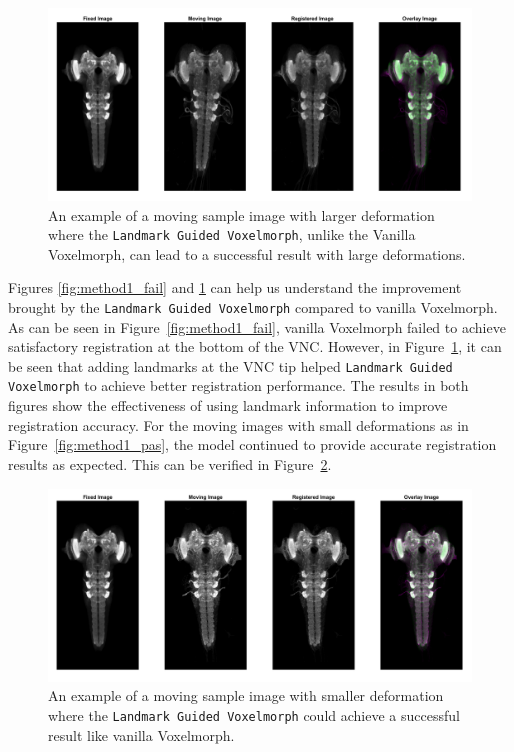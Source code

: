 \documentclass{book}
\begin{document}
	\begin{figure}[h!]
		\centering
		\includegraphics[width=0.9\columnwidth]{resources/chapter4/method2/np_60H12_14E09_MB049B_020113B_scaled.tif.png}
		\caption{An example of a moving sample image with larger deformation where the \texttt{Landmark Guided Voxelmorph}, unlike the Vanilla Voxelmorph, can lead to a successful result with large deformations.}
		\label{fig:method2_fail}
	\end{figure}
	
	Figures \ref{fig:method1_fail} and \ref{fig:method2_fail} can help us understand the improvement brought by the \texttt{Landmark Guided Voxelmorph} compared to vanilla Voxelmorph. As can be seen in Figure~\ref{fig:method1_fail}, vanilla Voxelmorph failed to achieve satisfactory registration at the bottom of the VNC. However, in Figure~\ref{fig:method2_fail}, it can be seen that adding landmarks at the VNC tip helped \texttt{Landmark Guided Voxelmorph} to achieve better registration performance. The results in both figures show the effectiveness of using landmark information to improve registration accuracy. For the moving images with small deformations as in Figure~\ref{fig:method1_pas}, the model continued to provide accurate registration results as expected. This can be verified in Figure~\ref{fig:method2_pas}.
	
	\begin{figure}[h!]
		\centering
		\includegraphics[width=0.9\columnwidth]{resources/chapter4/method2/np_brain7_scaled.tif.png}
		\caption{An example of a moving sample image with smaller deformation where the \texttt{Landmark Guided Voxelmorph} could achieve a successful result like vanilla Voxelmorph.}
		\label{fig:method2_pas}
	\end{figure}
	
\end{document}
